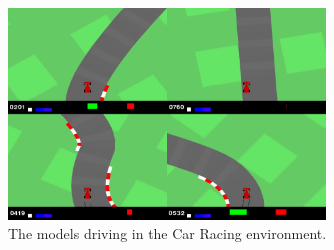 \begin{figure}[htbp]
    \centering
    \includegraphics[width=0.75\textwidth]{figures/images/car.png}
    \caption{The models driving in the Car Racing environment.}
    \label{fig:car_racing}
\end{figure}
